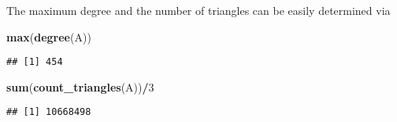 \documentclass[
]{article}
\newenvironment{Shaded}{\begin{snugshade}}{\end{snugshade}}
\newcommand{\DecValTok}[1]{\textcolor[rgb]{0.00,0.00,0.81}{#1}}
\newcommand{\KeywordTok}[1]{\textcolor[rgb]{0.13,0.29,0.53}{\textbf{#1}}}
\newcommand{\NormalTok}[1]{#1}
\newcommand{\OperatorTok}[1]{\textcolor[rgb]{0.81,0.36,0.00}{\textbf{#1}}}
\begin{document}
The maximum degree and the number of triangles can be easily determined
via

\begin{Shaded}
\begin{Highlighting}[]
\KeywordTok{max}\NormalTok{(}\KeywordTok{degree}\NormalTok{(A))}
\end{Highlighting}
\end{Shaded}

\begin{verbatim}
## [1] 454
\end{verbatim}

\begin{Shaded}
\begin{Highlighting}[]
\KeywordTok{sum}\NormalTok{(}\KeywordTok{count_triangles}\NormalTok{(A))}\OperatorTok{/}\DecValTok{3}
\end{Highlighting}
\end{Shaded}

\begin{verbatim}
## [1] 10668498
\end{verbatim}
\end{document}
